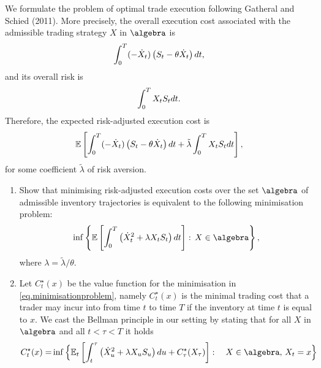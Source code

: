 \documentclass[10pt,a4paper]{article}
\begin{document}
\begin{exercise}
We formulate the problem of optimal trade execution following Gatheral and Schied (2011). 
More precisely, the overall execution cost associated with the admissible trading strategy $X$ in $\algebra$ is 
  \begin{equation*}
    \int_{0}^{T} (- \dot{X}_t)\left( S_t - \theta \dot{X}_t\right) dt, 
  \end{equation*}
and its overall risk is
  \begin{equation*}
    \int_{0}^{T} X_t S_t dt.
  \end{equation*}
Therefore, the expected risk-adjusted execution cost is 
  \begin{equation*}
    \mathbb{{E}} 
    \left[ 
    \int_{0}^{T} (- \dot{X}_t)\left( S_t - \theta \dot{X}_t\right) dt 
    +\tilde{\lambda} \int_{0}^{T} X_t S_t dt
    \right],
  \end{equation*}
  for some coefficient $\tilde{\lambda}$ of risk aversion.
\begin{enumerate}[label={\textbf{\ref{ex.GS11}.\arabic{*}}}, ref={Exercise {\ref{ex.GS11}.\arabic{*}}}]
  \item 
    Show that minimising risk-adjusted execution costs over the set $\algebra$ of admissible inventory trajectories is equivalent to the following minimisation problem:
    \begin{equation}
      \label{eq.minimisationproblem}
      \inf \left\lbrace 
      \Expectation \left[ 
      \int_{0}^{T} \left( \dot{X}_{t}\squared + \lambda X_t \price_t \right) dt 
      \right] : \, X \in \algebra
      \right\rbrace,
    \end{equation}
    where $\lambda = \tilde{\lambda}/\theta$. 
  \item
    Let $C^{\star}_t (x)$ be the value function for the minimisation in  \eqref{eq.minimisationproblem}, 
    namely $C^{\star}_t (x)$ is the minimal trading cost 
    that a trader may incur into from time $t$ to time $T$ if the inventory at time $t$ is equal to $x$. 
    We cast the Bellman principle in our setting by stating that for all $X$ in $\algebra$ and all $t<\tau<T$ it holds
    \begin{equation}
      \begin{split}
        C^{\star}_t(x) = &
        \inf \Big\lbrace
        \Expectation_t \left[
        \int_{t}^{\tau} \left(\dot{X}_{u}\squared + \lambda X_u \price_u \right)du
        + 
          C^{\star}_{\tau}(X_{\tau})
        \right]:
        \quad X\in \algebra, \, X_t=x
      \Big\rbrace
      \end{split}

\end{equation}
\end{enumerate}
\end{exercise}
\end{document}
